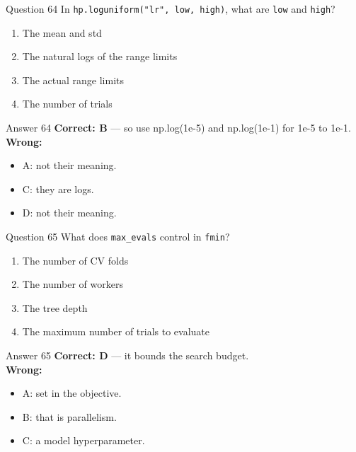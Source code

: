\documentclass[aspectratio=169,11pt]{beamer}
\begin{document}
\begin{frame}{Question 64}
In \texttt{hp.loguniform("lr", low, high)}, what are \texttt{low} and \texttt{high}?
\begin{enumerate}[label=\Alph*.]
\item The mean and std
\item The natural logs of the range limits
\item The actual range limits
\item The number of trials
\end{enumerate}
\end{frame}
\begin{frame}{Answer 64}
\textbf{Correct: B} --- so use np.log(1e-5) and np.log(1e-1) for 1e-5 to 1e-1.\\
\vspace{0.5em}
\textbf{Wrong:}
\begin{itemize}
\item A: not their meaning.
\item C: they are logs.
\item D: not their meaning.
\end{itemize}
\end{frame}

\begin{frame}{Question 65}
What does \texttt{max\_evals} control in \texttt{fmin}?
\begin{enumerate}[label=\Alph*.]
\item The number of CV folds
\item The number of workers
\item The tree depth
\item The maximum number of trials to evaluate
\end{enumerate}
\end{frame}
\begin{frame}{Answer 65}
\textbf{Correct: D} --- it bounds the search budget.\\
\vspace{0.5em}
\textbf{Wrong:}
\begin{itemize}
\item A: set in the objective.
\item B: that is parallelism.
\item C: a model hyperparameter.
\end{itemize}
\end{frame}
\end{document}

